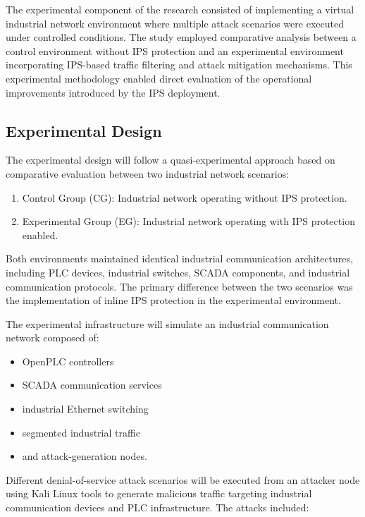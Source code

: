 \documentclass[sigconf]{acmart}
\begin{document}
The experimental component of the research consisted of implementing a virtual industrial network environment where multiple attack scenarios were executed under controlled conditions. The study employed comparative analysis between a control environment without IPS protection and an experimental environment incorporating IPS-based traffic filtering and attack mitigation mechanisms. This experimental methodology enabled direct evaluation of the operational improvements introduced by the IPS deployment.

\subsection{Experimental Design}
The experimental design will follow a quasi-experimental approach based on comparative evaluation between two industrial network scenarios:

\begin{enumerate}
    \item Control Group (CG): Industrial network operating without IPS protection.
    \item Experimental Group (EG): Industrial network operating with IPS protection enabled.
\end{enumerate}

Both environments maintained identical industrial communication architectures, including PLC devices, industrial switches, SCADA components, and industrial communication protocols. The primary difference between the two scenarios was the implementation of inline IPS protection in the experimental environment.

The experimental infrastructure will simulate an industrial communication network composed of:

\begin{itemize}
    \item OpenPLC controllers
    \item SCADA communication services
    \item industrial Ethernet switching
    \item segmented industrial traffic
    \item and attack-generation nodes.
\end{itemize}

Different denial-of-service attack scenarios will be executed from an attacker node using Kali Linux tools to generate malicious traffic targeting industrial communication devices and PLC infrastructure. The attacks included:
\end{document}
